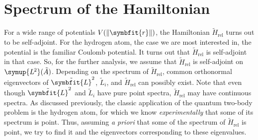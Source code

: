 \documentclass[12pt, a4 paper]{article}
\theoremstyle{definition}
\newcommand{\ltwo}{\symup{L\kern-0.5pt^2}}
\newcommand{\rvec}{\symbfit{r}}
\newcommand{\lvecsquare}{\tilde{\symbfit{L}}^2}
\newcommand{\hrel}{\tilde{H}_\text{rel}}
\newcommand{\ltwoa}{\ltwo(\tilde{A})}
\DeclarePairedDelimiter{\norm}{\lVert}{\rVert}
\begin{document}
    \section{Spectrum of the Hamiltonian}

    For a wide range of potentials \(V(\norm{\rvec})\), the Hamiltonian \(\hrel\) turns out to be self-adjoint. For the hydrogen atom, the case we are most interested in, the potential is the familiar Coulomb potential. It turns out that \(\hrel\) is self-adjoint in that case. So, for the further analysis, we assume that \(\hrel\) is self-adjoint on \(\ltwoa\). Depending on the spectrum of \(\hrel\), common orthonormal eigenvectors of \(\lvecsquare\), \(\tilde{L}_i\), and \(\hrel\) can possibly exist. Note that even though \(\lvecsquare\) and \(\tilde{L}_i\) have pure point spectra, \(\hrel\) may have continuous spectra. As discussed previously, the classic application of the quantum two-body problem is the hydrogen atom, for which we know \textit{experimentally} that some of its spectrum is point. Thus, assuming \textit{a priori} that some of the spectrum of \(\hrel\) is point, we try to find it and the eigenvectors corresponding to these eigenvalues.
\end{document}
